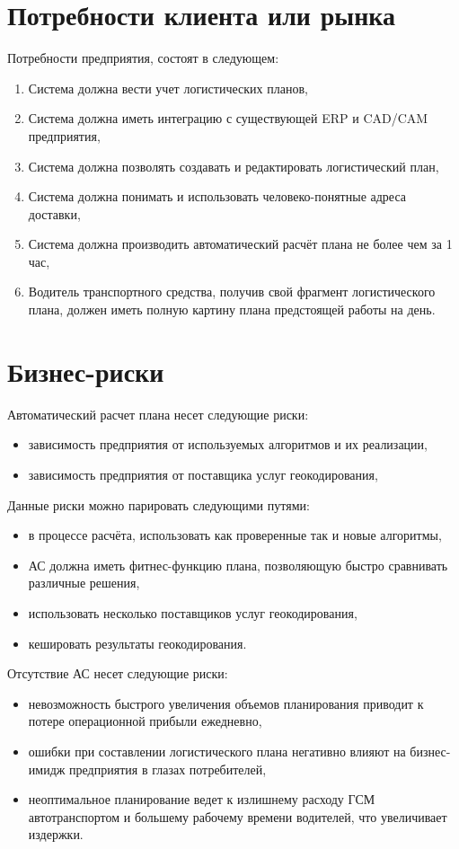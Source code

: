 \section{Потребности клиента или рынка}
\label{sec:reqirements}

Потребности предприятия, состоят в следующем:
\begin{enumerate}[label=HGH-\arabic*]
    \item Система должна вести учет логистических планов,
    \item Система должна иметь интеграцию с существующей ERP и CAD/CAM предприятия,
    \item Система должна позволять создавать и редактировать логистический план,
    \item Система должна понимать и использовать человеко-понятные адреса доставки,
    \item Система должна производить автоматический расчёт плана не более чем за 1 час,
    \item Водитель транспортного средства, получив свой фрагмент логистического плана, должен иметь полную картину плана предстоящей работы на день.
\end{enumerate}


\section{Бизнес-риски}
\label{sec:risks}

Автоматический расчет плана несет следующие риски:
\begin{itemize}
    \item зависимость предприятия от используемых алгоритмов и их реализации,
    \item зависимость предприятия от поставщика услуг геокодирования,
\end{itemize}

Данные риски можно парировать следующими путями:
\begin{itemize}
    \item в процессе расчёта, использовать как проверенные так и новые алгоритмы,
    \item АС должна иметь фитнес-функцию плана, позволяющую быстро сравнивать различные решения,
    \item использовать несколько поставщиков услуг геокодирования,
    \item кешировать результаты геокодирования.
\end{itemize}

Отсутствие АС несет следующие риски:
\begin{itemize}
    \item невозможность быстрого увеличения объемов планирования приводит к потере операционной прибыли ежедневно,
    \item ошибки при составлении логистического плана негативно влияют на бизнес-имидж предприятия в глазах потребителей,
    \item неоптимальное планирование ведет к излишнему расходу ГСМ автотранспортом и большему рабочему времени водителей, что увеличивает издержки.
\end{itemize}

\endinput
